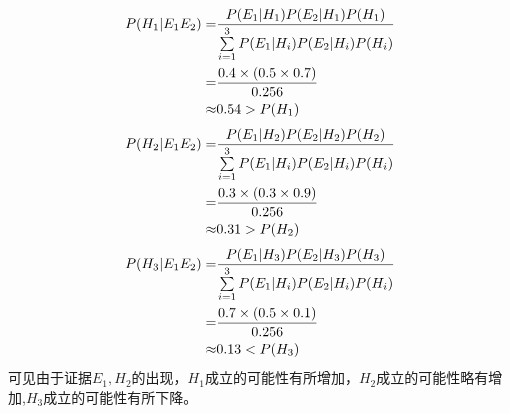 \begin{answer}
\begin{subanswer}
\begin{align}
    P(H_1|E_1E_2)=& \frac{P(E_1|H_1)P(E_2|H_1)P(H_1)} {\sum\limits_{i=1}^{3}P(E_1|H_i)P(E_2|H_i)P(H_i)} \notag\\
    =&\frac{0.4 \times (0.5 \times 0.7)}{0.256} \notag\\
    \approx&0.54>P(H_1)
    \end{align}
    \begin{align}
    P(H_2|E_1E_2)=& \frac{P(E_1|H_2)P(E_2|H_2)P(H_2)} {\sum\limits_{i=1}^{3}P(E_1|H_i)P(E_2|H_i)P(H_i)} \notag\\
    =&\frac{0.3 \times (0.3 \times 0.9)}{0.256} \notag\\
    \approx&0.31>P(H_2)
    \end{align}
    \begin{align}
    P(H_3|E_1E_2)=& \frac{P(E_1|H_3)P(E_2|H_3)P(H_3)} {\sum\limits_{i=1}^{3}P(E_1|H_i)P(E_2|H_i)P(H_i)} \notag\\
    =&\frac{0.7 \times (0.5 \times 0.1)}{0.256} \notag\\
    \approx&0.13<P(H_3)
    \end{align}
    可见由于证据$E_1,H_2$的出现，$H_1$成立的可能性有所增加，$H_2$成立的可能性略有增加,$H_3$成立的可能性有所下降。
\end{subanswer}
\end{answer}
